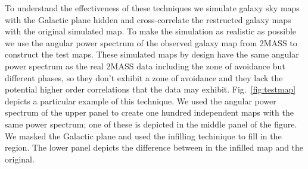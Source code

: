 \documentclass[useAMS,usenatbib]{mn2e}
\begin{document}
To understand the effectiveness of these techniques we simulate galaxy
sky maps with the Galactic plane hidden and cross-correlate the
restructed galaxy maps with the original simulated map.  To make the
simulation as realistic as possible we use the angular power spectrum
of the observed galaxy map from 2MASS to construct the test maps.
These simulated maps by design have the same angular power spectrum as
the real 2MASS data including the zone of avoidance but different
phases, so they don't exhibit a zone of avoidance and they lack the
potential higher order correlations that the data may exhibit.
Fig.~\ref{fig:testmap} depicts a particular example of this technique.
We used the angular power spectrum of the upper panel to create one
hundred independent maps with the same power spectrum; one of these is
depicted in the middle panel of the figure.  We masked the Galactic
plane and used the infilling techinique to fill in the region.  The
lower panel depicts the difference between in the infilled map and the
original.
\end{document}
